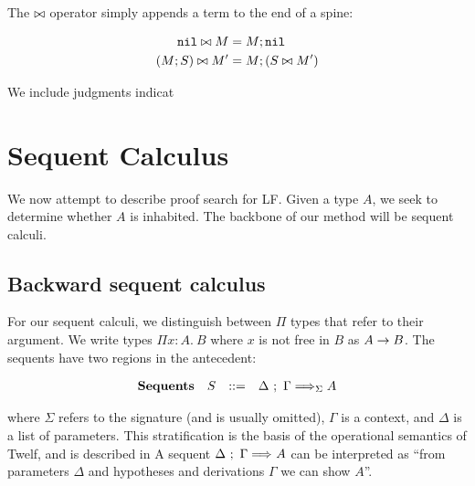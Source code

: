 \documentclass[11pt,twoside]{article}
\begin{document}
\bigskip 
{}
\bigskip 

The $\bowtie$ operator simply appends a term to the end of a spine:

\begin{align*} 
\mathtt{nil}\bowtie M &= M;\mathtt{nil}\\
(M;S)\bowtie M' &= M;(S\bowtie M')
\end{align*} 


We include judgments indicat




\section{Sequent Calculus}

We now attempt to describe proof search for LF.
Given a type $A$, we seek to determine whether $A$ 
is inhabited. The backbone of our method will be sequent calculi.

\renewcommand{\PiTyp}[3]{\Pi #1 : #2.\ #3}
\renewcommand{\Lam}[2]{\lambda #1.\ #2}


\subsection{Backward sequent calculus}
For our sequent calculi, we distinguish between $\Pi$ types
that refer to their argument.  We write types 
$\PiTyp{x}{A}{B}$ where $x$ is not free in $B$ as
$A \to B$.  The sequents have two regions in the antecedent:

\newcommand{\Sequent}[4][]{#2\ ;\ #3 \SeqArr_{#1} #4}

$$
\begin{array}{llll}
\mathbf{Sequents} & S & ::= & \Sequent[\Sigma]{\Delta}{\Gamma}{A} \\
\end{array} 
$$

\noindent 
where $\Sigma$ refers to the signature (and is usually omitted),
$\Gamma$ is a context, and $\Delta$ is a list of parameters.   
This stratification is the basis of the operational semantics
of Twelf, and is described in 
A sequent $\Sequent{\Delta}{\Gamma}{A}$
can be interpreted as ``from parameters $\Delta$ and hypotheses 
and derivations $\Gamma$ we can show $A$''.  
\end{document}
